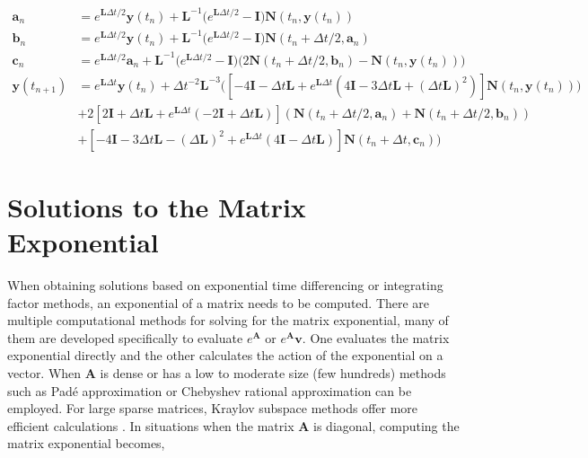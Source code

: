\begin{equation}
\begin{split}
     \boldsymbol{a}_{n} &= e^{\boldsymbol{L}\Delta t/2}\boldsymbol{y}(t_{n}) + \boldsymbol{L}^{-1}\big(e^{\boldsymbol{L}\Delta t/2} - \boldsymbol{I} \big)\boldsymbol{N}(t_{n},\boldsymbol{y}(t_{n})) \\
    \boldsymbol{b}_{n} &= e^{\boldsymbol{L}\Delta t/2}\boldsymbol{y}(t_{n}) + \boldsymbol{L}^{-1}\big(e^{\boldsymbol{L}\Delta t/2} - \boldsymbol{I} \big)\boldsymbol{N}(t_{n}+\Delta t/2,\boldsymbol{a}_{n}) \\
     \boldsymbol{c}_{n} &= e^{\boldsymbol{L}\Delta t/2}\boldsymbol{a}_{n} + \boldsymbol{L}^{-1}\big(e^{\boldsymbol{L}\Delta t/2} - \boldsymbol{I} \big)\big(2\boldsymbol{N}(t_{n}+\Delta t/2,\boldsymbol{b} _{n}) - \boldsymbol{N}(t_{n},\boldsymbol{y}(t_{n}))\big) \\
     \boldsymbol{y}(t_{n+1}) &= e^{\boldsymbol{L}\Delta t}\boldsymbol{y}(t_{n}) + \Delta t^{-2}\boldsymbol{L}^{-3}\big([-4\boldsymbol{I} - \Delta t\boldsymbol{L} + e^{\boldsymbol{L}\Delta t}(4\boldsymbol{I} -3\Delta t\boldsymbol{L} + (\Delta t\boldsymbol{L})^{2})]\boldsymbol{N}(t_{n}, \boldsymbol{y}(t_{n}))) \\
     &+ 2[2\boldsymbol{I} + \Delta t\boldsymbol{L} + e^{\boldsymbol{L}\Delta t}(-2\boldsymbol{I} + \Delta t\boldsymbol{L})](\boldsymbol{N}(t_{n} + \Delta t/2, \boldsymbol{a}_{n}) + \boldsymbol{N}(t_{n} + \Delta t/2, \boldsymbol{b}_{n})) \\
     &+ [-4\boldsymbol{I} - 3\Delta t\boldsymbol{L} - (\Delta\boldsymbol{L})^{2} + e^{\boldsymbol{L}\Delta t}(4\boldsymbol{I} - \Delta t\boldsymbol{L})]\boldsymbol{N}(t_{n}+\Delta t, \boldsymbol{c}_{n})\big)
\end{split}
\end{equation}



\section{Solutions to the Matrix Exponential}
When obtaining solutions based on exponential time differencing or integrating factor methods, an exponential of a matrix needs to be computed. There are multiple computational methods for solving for the matrix exponential, many of them are developed specifically to evaluate $e^{\boldsymbol{A}}$ or $e^{\boldsymbol{A}}\boldsymbol{v}$. One evaluates the matrix exponential directly and the other calculates the action of the exponential on a vector. When $\boldsymbol{A}$ is dense or has a low to moderate size (few hundreds) methods such as Pad\'e approximation or Chebyshev rational approximation can be employed. For large sparse matrices, Kraylov subspace methods offer more efficient calculations \cite{exokit}. In situations when the matrix $\boldsymbol{A}$ is diagonal, computing the matrix exponential becomes,

